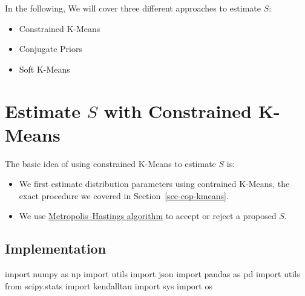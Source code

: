 \documentclass[
  letterpaper,
  DIV=11,
  numbers=noendperiod]{scrreprt}
\newenvironment{Shaded}{\begin{snugshade}}{\end{snugshade}}
\newcommand{\ImportTok}[1]{\textcolor[rgb]{0.00,0.46,0.62}{#1}}
\newcommand{\NormalTok}[1]{\textcolor[rgb]{0.00,0.23,0.31}{#1}}
\providecommand{\tightlist}{%
  \setlength{\itemsep}{0pt}\setlength{\parskip}{0pt}}\usepackage{longtable,booktabs,array}
\begin{document}
In the following, We will cover three different approaches to estimate
\(S\):

\begin{itemize}
\tightlist
\item
  Constrained K-Means
\item
  Conjugate Priors
\item
  Soft K-Means
\end{itemize}


\chapter{\texorpdfstring{Estimate \(S\) with Constrained
K-Means}{Estimate S with Constrained K-Means}}\label{sec-estS-cop-kmeans}

The basic idea of using constrained K-Means to estimate \(S\) is:

\begin{itemize}
\tightlist
\item
  We first estimate distribution parameters using contrained K-Means,
  the exact procedure we covered in Section~\ref{sec-cop-kmeans}.
\item
  We use
  \href{https://en.wikipedia.org/wiki/Metropolis\%E2\%80\%93Hastings_algorithm}{Metropolis--Hastings
  algorithm} to accept or reject a proposed \(S\).
\end{itemize}

\section{Implementation}\label{implementation-1}

\begin{Shaded}
\begin{Highlighting}[]
\ImportTok{import}\NormalTok{ numpy }\ImportTok{as}\NormalTok{ np }
\ImportTok{import}\NormalTok{ utils }
\ImportTok{import}\NormalTok{ json }
\ImportTok{import}\NormalTok{ pandas }\ImportTok{as}\NormalTok{ pd }
\ImportTok{import}\NormalTok{ utils }
\ImportTok{from}\NormalTok{ scipy.stats }\ImportTok{import}\NormalTok{ kendalltau}
\ImportTok{import}\NormalTok{ sys}
\ImportTok{import}\NormalTok{ os}
\end{Highlighting}
\end{Shaded}
\end{document}
